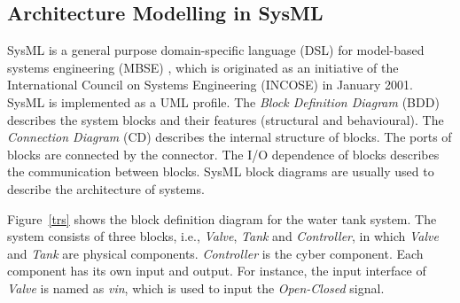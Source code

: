 \subsection{Architecture Modelling in SysML}

\begin{figure}[htbp]
\end{figure}

SysML is a general purpose domain-specific language (DSL) \cite{SemerathBHSV17} for model-based systems engineering (MBSE) \cite{Dori16}, which is originated as an initiative of the International Council on Systems Engineering (INCOSE) \cite{Pepper2015International} in January 2001. SysML is implemented as a UML profile. The \textit{Block Definition Diagram }(BDD) describes the system blocks and their features (structural and behavioural). The\textit{ Connection Diagram} (CD) describes the internal structure of blocks. The ports of blocks are connected by the connector. The I/O dependence of blocks describes the communication between blocks. SysML block diagrams are usually used to describe the architecture of systems.

Figure~\ref{trs} shows the block definition diagram for the water tank system. The system consists of three blocks, i.e., \emph{Valve}, \emph{Tank} and \emph{Controller}, in which \emph{Valve} and \emph{Tank} are physical components. \emph{Controller} is the cyber component. Each component has its own input and output. For instance, the input interface of \emph{Valve} is named as \emph{vin}, which is used to input the \emph{Open-Closed} signal. 


